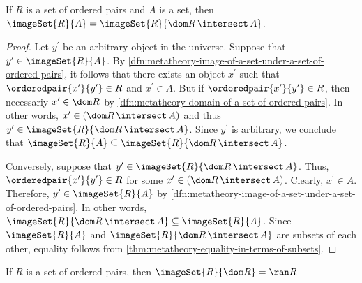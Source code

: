 \begin{thm}
     \label{thm:metatheory-image-of-a-set-under-a-set-of-ordered-pairs-is-the-image-of-the-intersection-between-the-domain-and-the-set-itself}
    If \( R \) is a set of ordered pairs and \( A \) is a set, then \( \imageSet{R}{A} = \imageSet{R}{\dom R \,{\intersect}\, A} \).
\end{thm}

\begin{proof}
    Let \( y^{\prime} \) be an arbitrary object in the universe.
    Suppose that \( y^{\prime} \in \imageSet{R}{A} \).
    By \cref{dfn:metatheory-image-of-a-set-under-a-set-of-ordered-pairs}, it follows that there exists
    an object \( x^{\prime} \) such that \( \orderedpair{x^{\prime}}{y^{\prime}} \in R \) and \( x^{\prime} \in A \).
    But if \( \orderedpair{x^{\prime}}{y^{\prime}} \in R  \), then necessariy \( x^{\prime} \in \dom R \) by
    \cref{dfn:metatheory-domain-of-a-set-of-ordered-pairs}.
    In other words, \( x^{\prime} \in \mleft( \dom R \,{\intersect}\, A \mright) \) and thus \( y^{\prime} \in \imageSet{R}{\dom R \,{\intersect}\, A} \).
    Since \( y^{\prime} \) is arbitrary, we conclude that \( \imageSet{R}{A} \subseteq \imageSet{R}{\dom R \,{\intersect}\, A} \).

    \vspace{0.3cm}
    \noindent
    Conversely, suppose that \( y^{\prime} \in \imageSet{R}{\dom R \,{\intersect}\, A} \).
    Thus, \( \orderedpair{x^{\prime}}{y^{\prime}} \in R \) for some \( x^{\prime} \in \mleft( \dom R \,{\intersect}\, A \mright) \).
    Clearly, \( x^{\prime} \in A \).
    Therefore, \( y^{\prime} \in \imageSet{R}{A} \) by \cref{dfn:metatheory-image-of-a-set-under-a-set-of-ordered-pairs}.
    In other words, \( \imageSet{R}{\dom R \,{\intersect}\, A} \subseteq \imageSet{R}{A} \).
    Since \( \imageSet{R}{A} \) and \( \imageSet{R}{\dom R \,{\intersect}\, A} \) are subsets of each other,
    equality follows from \cref{thm:metatheory-equality-in-terms-of-subsets}.
\end{proof}

\begin{thm}
     \label{thm:metatheory-image-of-the-domain-of-a-set-of-ordered-pairs-under-itself-equals-its-range}
    If \( R \) is a set of ordered pairs, then \( \imageSet{R}{\dom R} = \ran R \)
\end{thm}

